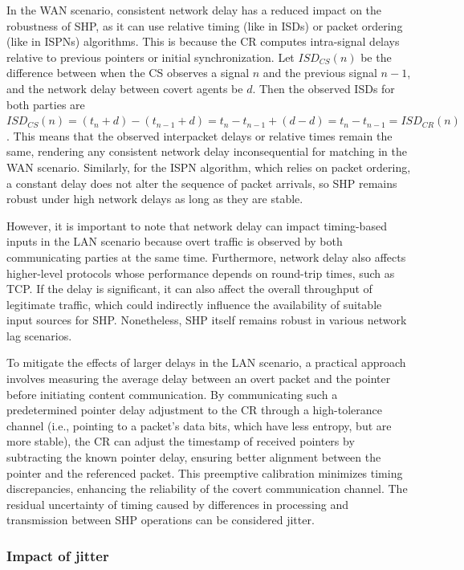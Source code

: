 \documentclass[journal]{IEEEtran}
\begin{document}
In the WAN scenario, consistent network delay has a reduced impact on the robustness of \ac{SHP}, as it can use relative timing (like in \ac{ISD}s) or packet ordering (like in \ac{ISPN}s) algorithms. This is because the \ac{CR} computes intra-signal delays relative to previous pointers or initial synchronization. Let $ISD_{CS}(n)$ be the difference between when the \ac{CS} observes a signal $n$ and the previous signal $n-1$, and the network delay between covert agents be $d$. Then the observed \ac{ISD}s for both parties are $ISD_{CS}(n)=(t_n+d)-(t_{n-1}+d)=t_n-t_{n-1}+(d-d)=t_n-t_{n-1}=ISD_{CR}(n)$. This means that the observed interpacket delays or relative times remain the same, rendering any consistent network delay inconsequential for matching in the WAN scenario. Similarly, for the \ac{ISPN} algorithm, which relies on packet ordering, a constant delay does not alter the sequence of packet arrivals, so \ac{SHP} remains robust under high network delays as long as they are stable.

However, it is important to note that network delay can impact timing-based inputs in the LAN scenario because overt traffic is observed by both communicating parties at the same time. Furthermore, network delay also affects higher-level protocols whose performance depends on round-trip times, such as \ac{TCP}. If the delay is significant, it can also affect the overall throughput of legitimate traffic, which could indirectly influence the availability of suitable input sources for \ac{SHP}. Nonetheless, \ac{SHP} itself remains robust in various network lag scenarios.

To mitigate the effects of larger delays in the LAN scenario, a practical approach involves measuring the average delay between an overt packet and the pointer before initiating content communication. By communicating such a predetermined pointer delay adjustment to the \ac{CR} through a high-tolerance channel (i.e., pointing to a packet's data bits, which have less entropy, but are more stable), the \ac{CR} can adjust the timestamp of received pointers by subtracting the known pointer delay, ensuring better alignment between the pointer and the referenced packet. This preemptive calibration minimizes timing discrepancies, enhancing the reliability of the covert communication channel. The residual uncertainty of timing caused by differences in processing and transmission between \ac{SHP} operations can be considered jitter.

\subsubsection{Impact of jitter}
\end{document}
